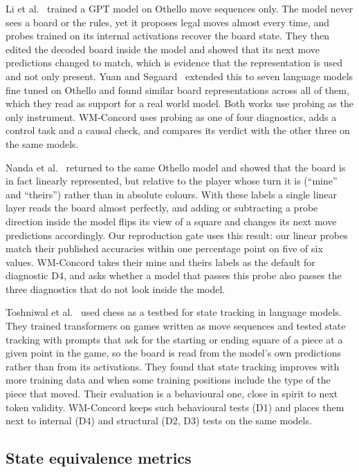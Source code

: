 \documentclass[11pt]{scrartcl}
\begin{document}
Li et al.~\cite{li2023othello} trained a GPT model on Othello move sequences only. The model never sees a
board or the rules, yet it proposes legal moves almost every time, and probes trained on its internal
activations recover the board state. They then edited the decoded board inside the model and showed that
its next move predictions changed to match, which is evidence that the representation is used and not only
present. Yuan and S{\o}gaard~\cite{yuan2025revisiting} extended this to seven language models fine tuned on
Othello and found similar board representations across all of them, which they read as support for a real
world model. Both works use probing as the only instrument. WM-Concord uses probing as one of four
diagnostics, adds a control task and a causal check, and compares its verdict with the other three on the
same models.

Nanda et al.~\cite{nanda2023emergent} returned to the same Othello model and showed that the board is in
fact linearly represented, but relative to the player whose turn it is (``mine'' and ``theirs'') rather than
in absolute colours. With these labels a single linear layer reads the board almost perfectly, and adding or
subtracting a probe direction inside the model flips its view of a square and changes its next move
predictions accordingly. Our reproduction gate uses this result: our linear probes match their published
accuracies within one percentage point on five of six values. WM-Concord takes their mine and theirs labels
as the default for diagnostic D4, and asks whether a model that passes this probe also passes the three
diagnostics that do not look inside the model.

Toshniwal et al.~\cite{toshniwal2022chess} used chess as a testbed for state tracking in language models.
They trained transformers on games written as move sequences and tested state tracking with prompts that ask
for the starting or ending square of a piece at a given point in the game, so the board is read from the
model's own predictions rather than from its activations. They found that state tracking improves with more
training data and when some training positions include the type of the piece that moved. Their evaluation is
a behavioural one, close in spirit to next token validity. WM-Concord keeps such behavioural tests (D1) and
places them next to internal (D4) and structural (D2, D3) tests on the same models.

\subsection{State equivalence metrics}
\end{document}
